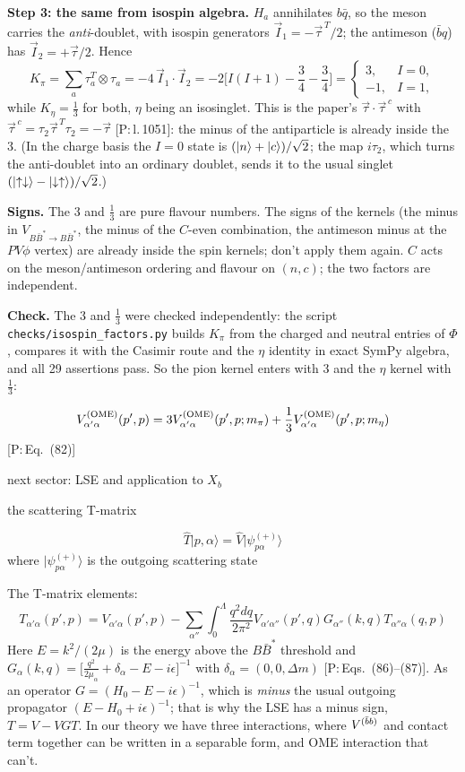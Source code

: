 \documentclass[11pt]{article}
\newcommand{\tagP}[1]{\textcolor{blue!65!black}{\textsf{\small[P:\,#1]}}}
\newcommand{\ai}[1]{\textcolor{aicolor}{#1}}
\newcommand{\ai}[1]{#1}
\newenvironment{aiadd}{\par}{\par}
\begin{document}
\begin{aiadd}
	\textbf{Step 3: the same from isospin algebra.} $H_a$ annihilates $b\bar q$, so the meson carries the \emph{anti}-doublet, with isospin generators $\vec I_1=-\vec\tau^{\,T}/2$; the antimeson ($\bar bq$) has $\vec I_2=+\vec\tau/2$. Hence
	\[
		K_\pi=\sum_a\tau_a^T\otimes\tau_a=-4\,\vec I_1\cdot\vec I_2=-2\Big[I(I+1)-\frac34-\frac34\Big]=\begin{cases}3,&I=0,\\-1,&I=1,\end{cases}
	\]
	while $K_\eta=\frac13$ for both, $\eta$ being an isosinglet. This is the paper's $\vec\tau\cdot\vec\tau^{\,c}$ with $\vec\tau^{\,c}=\tau_2\vec\tau^{\,T}\tau_2=-\vec\tau$ \tagP{l.\,1051}: the minus of the antiparticle is already inside the 3. (In the charge basis the $I=0$ state is $(\ket n+\ket c)/\sqrt2$; the map $i\tau_2$, which turns the anti-doublet into an ordinary doublet, sends it to the usual singlet $(\ket{\uparrow\downarrow}-\ket{\downarrow\uparrow})/\sqrt2$.)

	\textbf{Signs.} The 3 and $\frac13$ are pure flavour numbers. The signs of the kernels (the minus in $V_{B\bar B^*\to B\bar B^*}$, the minus of the $C$-even combination, the antimeson minus at the $PV\phi$ vertex) are already inside the spin kernels; don't apply them again. $C$ acts on the meson/antimeson ordering and flavour on $(n,c)$; the two factors are independent.

	\textbf{Check.} The 3 and $\frac13$ were checked independently: the script \texttt{checks/isospin\_factors.py} builds $K_\pi$ from the charged and neutral entries of $\Phi$, compares it with the Casimir route and the $\eta$ identity in exact SymPy algebra, and all 29 assertions pass. So the pion kernel enters with 3 and the $\eta$ kernel with $\frac13$:
\end{aiadd}

\[
	V_{\alpha'\alpha}^{(\rm OME)}(p',p) = 3V_{\alpha'\alpha}^{(\rm OME)}(p',p;m_\pi) + \frac{1}{3}V_{\alpha'\alpha}^{(\rm OME)}(p',p;m_\eta)
\]
\ai{\tagP{Eq.~(82)}}


next sector: LSE and application to $X_b$

the scattering T-matrix

\[
	\hat T \lvert p,\alpha \rangle = \hat V \lvert \psi_{p\alpha}^{(+)} \rangle
\]
where $\lvert \psi_{p\alpha}^{(+)} \rangle$ is the outgoing scattering state

The T-matrix elements:
\[
	T_{\alpha'\alpha}(p',p) = V_{\alpha'\alpha}(p',p) - \sum_{\alpha''}\int_0^\Lambda \frac{q^2dq}{2\pi^2}V_{\alpha'\alpha''}(p',q)G_{\alpha''}(k,q)T_{\alpha''\alpha}(q,p)
\]
\ai{Here $E=k^2/(2\mu)$ is the energy above the $B\bar B^*$ threshold and $G_\alpha(k,q)=\big[\frac{q^2}{2\mu_\alpha}+\delta_\alpha-E-i\epsilon\big]^{-1}$ with $\delta_\alpha=(0,0,\Delta m)$ \tagP{Eqs.~(86)--(87)}. As an operator $G=(H_0-E-i\epsilon)^{-1}$, which is \emph{minus} the usual outgoing propagator $(E-H_0+i\epsilon)^{-1}$; that is why the LSE has a minus sign, $T=V-VGT$.}
In our theory we have three interactions, where $V^{(\bar{b}b)}$ and contact term together can be written in a separable form, and OME interaction that can't.
\end{document}
